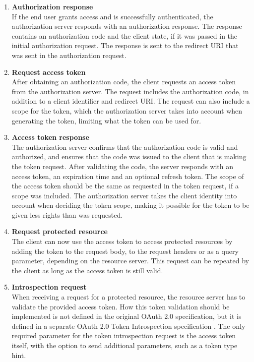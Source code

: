 \begin{enumerate}
    \item \textbf{Authorization response} \\
    If the end user grants access and is successfully authenticated, the authorization server responds with an authorization response.
    The response contains an authorization code and the client state, if it was passed in the initial authorization request.
    The response is sent to the redirect URI that was sent in the authorization request.
    \item \textbf{Request access token} \\
    After obtaining an authorization code, the client requests an access token from the authorization server.
    The request includes the authorization code, in addition to a client identifier and redirect URI.
    The request can also include a scope for the token, which the authorization server takes into account when generating the token, limiting what the token can be used for.
    \item \textbf{Access token response} \\
    The authorization server confirms that the authorization code is valid and authorized, and ensures that the code was issued to the client that is making the token request. 
    After validating the code, the server responds with an access token, an expiration time and an optional refresh token.
    The scope of the access token should be the same as requested in the token request, if a scope was included.
    The authorization server takes the client identity into account when deciding the token scope, making it possible for the token to be given less rights than was requested.
    \item \textbf{Request protected resource} \\
    The client can now use the access token to access protected resources by adding the token to the request body, to the request headers or as a query parameter, depending on the resource server.
    This request can be repeated by the client as long as the access token is still valid.
    \item \textbf{Introspection request} \\
    When receiving a request for a protected resource, the resource server has to validate the provided access token.
    How this token validation should be implemented is not defined in the original OAuth 2.0 specification, but it is defined in a separate OAuth 2.0 Token Introspection specification \citep{richer_oauth_2015}.
    The only required parameter for the token introspection request is the access token itself, with the option to send additional parameters, such as a token type hint.

\end{enumerate}
